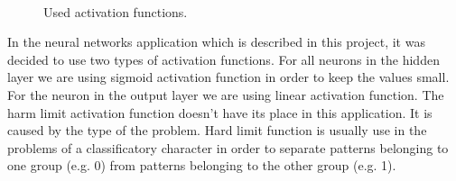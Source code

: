 \documentclass[a4paper,oneside,onecolumn,11pt]{report}
\begin{document}
		\begin{figure}
			\centering
			\\
			\caption{Used activation functions.}
			\label{activation_funcs}
		\end{figure}

		In the neural networks application which is described in this project, it was decided to use two
		types of activation functions. For all neurons in the hidden layer we are using sigmoid
		activation function in order to keep the values small. For the neuron in the output layer
		we are using linear activation function. The harm limit activation function doesn't have its
		place in this application. It is caused by the type of the problem. Hard limit function is 
		usually use in the problems of a classificatory character in order to separate patterns belonging
		to one group (e.g. 0) from patterns belonging to the other group (e.g. 1). \cite{Papavasileiou2014}
\end{document}
